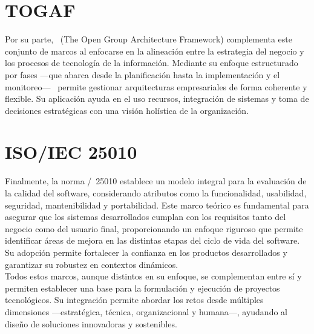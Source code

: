\section{TOGAF}
Por su parte, \TOGAF\ (The Open Group Architecture Framework) complementa este conjunto de marcos al enfocarse en la alineación entre la estrategia del negocio y los procesos de tecnología de la información. Mediante su enfoque estructurado por fases —que abarca desde la planificación hasta la implementación y el monitoreo— \TOGAF\ permite gestionar arquitecturas empresariales de forma coherente y flexible. Su aplicación ayuda en el uso recursos, integración de sistemas y toma de decisiones estratégicas con una visión holística de la organización\citep{Mumtaza2025}.

\section{ISO/IEC 25010}
Finalmente, la norma \ISO/\IEC\ 25010 establece un modelo integral para la evaluación de la calidad del software, considerando atributos como la funcionalidad, usabilidad, seguridad, mantenibilidad y portabilidad\citep{ISO25010}. Este marco teórico es fundamental para asegurar que los sistemas desarrollados cumplan con los requisitos tanto del negocio como del usuario final, proporcionando un enfoque riguroso que permite identificar áreas de mejora en las distintas etapas del ciclo de vida del software. Su adopción permite fortalecer la confianza en los productos desarrollados y garantizar su robustez en contextos dinámicos.\\

Todos estos marcos, aunque distintos en su enfoque, se complementan entre sí y permiten establecer una base para la formulación y ejecución de proyectos tecnológicos. Su integración permite abordar los retos desde múltiples dimensiones —estratégica, técnica, organizacional y humana—, ayudando al diseño de soluciones innovadoras y sostenibles.